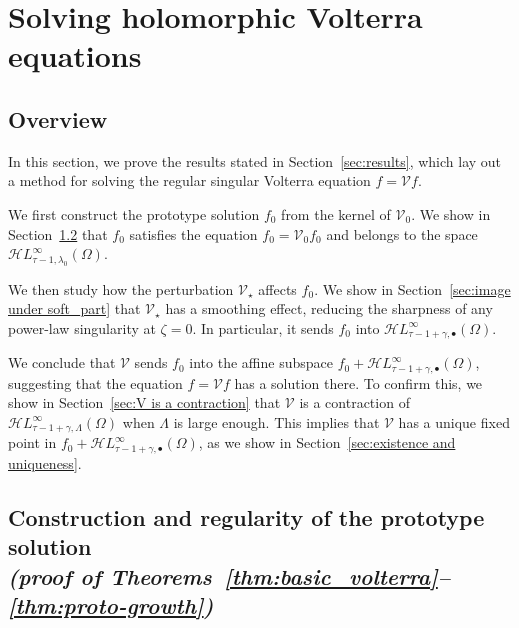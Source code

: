 \documentclass{article}
\theoremstyle{definition}
\theoremstyle{plain}
\newcommand{\singexp}[2]{\mathcal{H}L^\infty_{#1, #2}}
\newcommand{\singexpalg}[1]{\singexp{#1}{\bullet}}
\newcommand{\volterra}{\mathcal{V}}
\newcommand{\hardpart}{\mathcal{V}_0}
\newcommand{\softpart}{\mathcal{V}_\star}
\newcommand{\solwhole}{f}
\newcommand{\solproto}{f_0}
\newcommand{\domain}{\Omega}
\begin{document}
\section{Solving holomorphic Volterra equations}\label{sec:proof_main_results}
\subsection{Overview}
In this section, we prove the results stated in Section~\ref{sec:results}, which lay out a method for solving the regular singular Volterra equation $\solwhole = \volterra \solwhole$.

We first construct the prototype solution $\solproto$ from the kernel of $\hardpart$. We show in Section~\ref{sec:proto-construction-regularity} that $\solproto$ satisfies the equation $\solproto = \hardpart \solproto$ and belongs to the space $\singexp{\tau-1}{\lambda_0}(\domain)$.

We then study how the perturbation $\softpart$ affects $\solproto$. We show in Section~\ref{sec:image under soft_part} that $\softpart$ has a smoothing effect, reducing the sharpness of any power-law singularity at $\zeta = 0$. In particular, it sends $\solproto$ into $\singexpalg{\tau-1+\gamma}(\domain)$.

We conclude that $\volterra$ sends $\solproto$ into the affine subspace $\solproto + \singexpalg{\tau-1+\gamma}(\domain)$, suggesting that the equation $\solwhole = \volterra \solwhole$ has a solution there. To confirm this, we show in Section~\ref{sec:V is a contraction} that $\volterra$ is a contraction of $\singexp{\tau-1+\gamma}{\Lambda}(\domain)$ when $\Lambda$ is large enough. This implies that $\volterra$ has a unique fixed point in $\solproto + \singexpalg{\tau-1+\gamma}(\domain)$, as we show in Section~\ref{sec:existence and uniqueness}.
\subsection{Construction and regularity of the prototype solution \\ \textit{(proof of Theorems~\ref{thm:basic_volterra}--\ref{thm:proto-growth})}}\label{sec:proto-construction-regularity}
\end{document}
